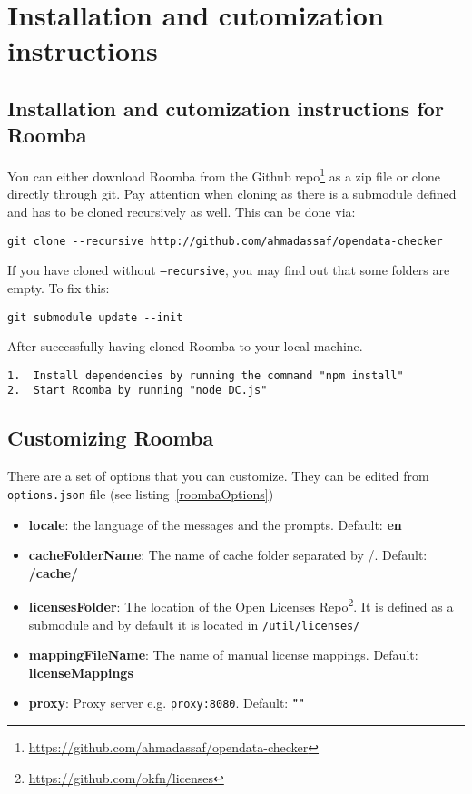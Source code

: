 \chapter{Installation and cutomization instructions}
\label{appendix:appendixD}

\section{Installation and cutomization instructions for Roomba}
\label{section:installation_roomba}

You can either download Roomba from the Github repo\footnote{\url{https://github.com/ahmadassaf/opendata-checker}} as a zip file or clone directly through git. Pay attention when cloning as there is a submodule defined and has to be cloned recursively as well. This can be done via:

\begin{verbatim}
git clone --recursive http://github.com/ahmadassaf/opendata-checker
\end{verbatim}

If you have cloned without \texttt{--recursive}, you may find out that some folders are empty. To fix this:
\begin{verbatim}
git submodule update --init
\end{verbatim}

After successfully having cloned Roomba to your local machine.
\begin{verbatim}
1.	Install dependencies by running the command "npm install"
2.	Start Roomba by running "node DC.js"
\end{verbatim}

\section{Customizing Roomba}

There are a set of options that you can customize. They can be edited from \texttt{options.json} file (see listing~\ref{roombaOptions})



\begin{itemize}
	\item \textbf{locale}: the language of the messages and the prompts. Default: \textbf{en}
	\item \textbf{cacheFolderName}: The name of cache folder separated by /. Default: \textbf{/cache/}
	\item \textbf{licensesFolder}: The location of the Open Licenses Repo\footnote{\url{https://github.com/okfn/licenses}}. It is defined as a submodule and by default it is located in \texttt{/util/licenses/}
	\item \textbf{mappingFileName}: The name of manual license mappings. Default: \textbf{licenseMappings}
	\item \textbf{proxy}: Proxy server e.g. \texttt{proxy:8080}. Default: \textbf{""}
\end{itemize}

